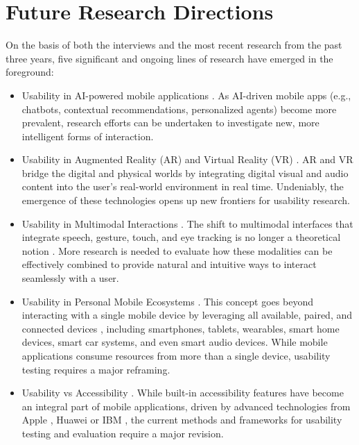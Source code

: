 \documentclass[preprint,12pt,number]{elsarticle}
\begin{document}
\section{Future Research Directions}
\label{sec:future-research-directions}
On the basis of both the interviews and the most recent research from the past three years, five significant and ongoing lines of research have emerged in the foreground:
\begin{itemize}
    \item Usability in AI-powered mobile applications \citep{deniz2023quality, nama2023ai, namoun2024predicting}. As AI-driven mobile apps (e.g., chatbots, contextual recommendations, personalized agents) become more prevalent, research efforts can be undertaken to investigate new, more intelligent forms of interaction.

    \item Usability in Augmented Reality (AR) \citep{sung2021effects, yavuz2021augmented, criollo2021towards} and Virtual Reality (VR) \citep{kim2021applications, chan2024using, omran2024virtual}. AR and VR bridge the digital and physical worlds by integrating digital visual and audio content into the user's real-world environment in real time. Undeniably, the emergence of these technologies opens up new frontiers for usability research.

    \item Usability in Multimodal Interactions \citep{oviatt2022multimodal, azofeifa2022systematic, dritsas2025multimodal}. The shift to multimodal interfaces that integrate speech, gesture, touch, and eye tracking is no longer a theoretical notion \citep{Carter2024}. More research is needed to evaluate how these modalities can be effectively combined to provide natural and intuitive ways to interact seamlessly with a user.

    \item Usability in Personal Mobile Ecosystems \citep{bender2021impact, cohen2021urban, eom2023effects}. This concept goes beyond interacting with a single mobile device by leveraging all available, paired, and connected devices \citep{mannonen2013approach}, including smartphones, tablets, wearables, smart home devices, smart car systems, and even smart audio devices. While mobile applications consume resources from more than a single device, usability testing requires a major reframing. 
    
    \item Usability vs Accessibility \citep{senjam2021smartphones, alajarmeh2022extent, zaina2022preventing}. While built-in accessibility features have become an integral part of mobile applications, driven by advanced technologies from Apple \citep{Carter2024b}, Huawei \citep{huawei2025} or IBM \citep{Takagi2021}, the current methods and frameworks for usability testing and evaluation require a major revision.
\end{itemize}
\end{document}
